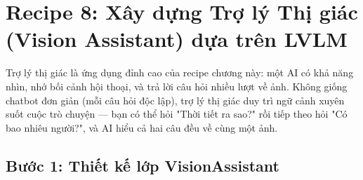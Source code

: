 \section{Recipe 8: Xây dựng Trợ lý Thị giác (Vision Assistant) dựa trên LVLM}
\label{sec:recipe_vision_assistant}

Trợ lý thị giác là ứng dụng đỉnh cao của recipe chương này: một AI có khả năng nhìn, nhớ bối cảnh hội thoại, và trả lời câu hỏi nhiều lượt về ảnh. Không giống chatbot đơn giản (mỗi câu hỏi độc lập), trợ lý thị giác duy trì ngữ cảnh xuyên suốt cuộc trò chuyện --- bạn có thể hỏi "Thời tiết ra sao?" rồi tiếp theo hỏi "Có bao nhiêu người?", và AI hiểu cả hai câu đều về cùng một ảnh.

\subsection{Bước 1: Thiết kế lớp VisionAssistant}
\label{subsec:va_class}

